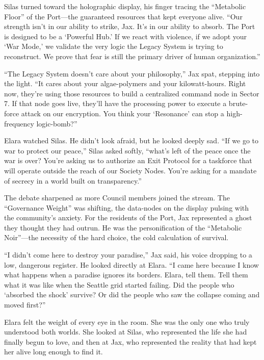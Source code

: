 
Silas turned toward the holographic display, his finger tracing the ``Metabolic Floor'' of the Port—the guaranteed resources that kept everyone alive. ``Our strength isn't in our ability to strike, Jax. It's in our ability to absorb. The Port is designed to be a `Powerful Hub.' If we react with violence, if we adopt your `War Mode,' we validate the very logic the Legacy System is trying to reconstruct. We prove that fear is still the primary driver of human organization.''

``The Legacy System doesn't care about your philosophy,'' Jax spat, stepping into the light. ``It cares about your algae-polymers and your kilowatt-hours. Right now, they're using those resources to build a centralized command node in Sector 7. If that node goes live, they'll have the processing power to execute a brute-force attack on our encryption. You think your `Resonance' can stop a high-frequency logic-bomb?''

Elara watched Silas. He didn't look afraid, but he looked deeply sad. ``If we go to war to protect our peace,'' Silas asked softly, ``what's left of the peace once the war is over? You're asking us to authorize an Exit Protocol for a taskforce that will operate outside the reach of our Society Nodes. You're asking for a mandate of secrecy in a world built on transparency.''


The debate sharpened as more Council members joined the stream. The ``Governance Weight'' was shifting, the data-nodes on the display pulsing with the community's anxiety. For the residents of the Port, Jax represented a ghost they thought they had outrun. He was the personification of the ``Metabolic Noir''—the necessity of the hard choice, the cold calculation of survival. 

``I didn't come here to destroy your paradise,'' Jax said, his voice dropping to a low, dangerous register. He looked directly at Elara. ``I came here because I know what happens when a paradise ignores its borders. Elara, tell them. Tell them what it was like when the Seattle grid started failing. Did the people who `absorbed the shock' survive? Or did the people who saw the collapse coming and moved first?''

Elara felt the weight of every eye in the room. She was the only one who truly understood both worlds. She looked at Silas, who represented the life she had finally begun to love, and then at Jax, who represented the reality that had kept her alive long enough to find it.

